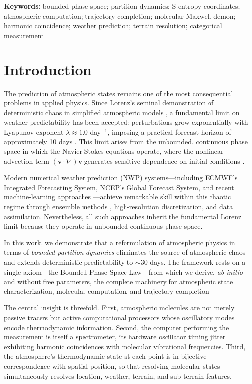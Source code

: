\documentclass[twocolumn,10pt]{article}
\theoremstyle{definition}
\begin{document}
\noindent\textbf{Keywords:} bounded phase space; partition dynamics; S-entropy coordinates; atmospheric computation; trajectory completion; molecular Maxwell demon; harmonic coincidence; weather prediction; terrain resolution; categorical measurement
\vspace{1em}

\section{Introduction}\label{sec:introduction}

The prediction of atmospheric states remains one of the most consequential problems in applied physics. Since Lorenz's seminal demonstration of deterministic chaos in simplified atmospheric models \citep{Lorenz1963}, a fundamental limit on weather predictability has been accepted: perturbations grow exponentially with Lyapunov exponent $\lambda \approx 1.0$ day$^{-1}$, imposing a practical forecast horizon of approximately 10 days \citep{Lorenz1969, Lorenz1982}. This limit arises from the unbounded, continuous phase space in which the Navier-Stokes equations operate, where the nonlinear advection term $(\mathbf{v} \cdot \nabla)\mathbf{v}$ generates sensitive dependence on initial conditions \citep{BatchelorGK2000, Fefferman2006}.

Modern numerical weather prediction (NWP) systems---including ECMWF's Integrated Forecasting System, NCEP's Global Forecast System, and recent machine-learning approaches \citep{Bauer2015, Palmer2019, Lam2023, Pathak2022}---achieve remarkable skill within this chaotic regime through ensemble methods \citep{Buizza1999}, high-resolution discretization, and data assimilation. Nevertheless, all such approaches inherit the fundamental Lorenz limit because they operate in unbounded continuous phase space.

In this work, we demonstrate that a reformulation of atmospheric physics in terms of \emph{bounded partition dynamics} eliminates the source of atmospheric chaos and extends deterministic predictability to $\sim$30 days. The framework rests on a single axiom---the Bounded Phase Space Law---from which we derive, \emph{ab initio} and without free parameters, the complete machinery for atmospheric state characterization, molecular computation, and trajectory completion.

The central insight is threefold. First, atmospheric molecules are not merely passive tracers but active computational processors whose oscillatory modes encode thermodynamic information. Second, the computer performing the measurement is itself a spectrometer, its hardware oscillator timing jitter exhibiting harmonic coincidences with molecular vibrational frequencies. Third, the atmosphere's thermodynamic state at each point is in bijective correspondence with spatial position, so that resolving molecular states simultaneously resolves location, weather, terrain, and sub-terrain features.
\end{document}
